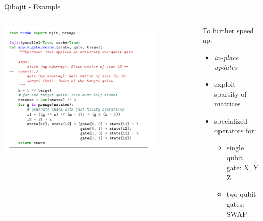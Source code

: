 \documentclass[11p,aspectratio=169]{beamer}
\begin{document}
\begin{frame}[fragile]{Qibojit - Example}

    \begin{columns}
        \begin{column}{0.7\textwidth}
            \hspace{1cm}
            \includegraphics[width = 0.8\textwidth]{figures/circuit.png}
        \end{column}

        \begin{column}{0.6\textwidth}
            To further speed up:
            \begin{itemize}
                \item \emph{in-place updates}
                \item exploit sparsity of matrices
                \item specialized operators for:
                \begin{itemize}
                    \item single qubit gate: X, Y Z
                    \item two qubit gates: SWAP
                \end{itemize}
            \end{itemize}
        \end{column}
    \end{columns}

    
\end{frame}

\end{document}
